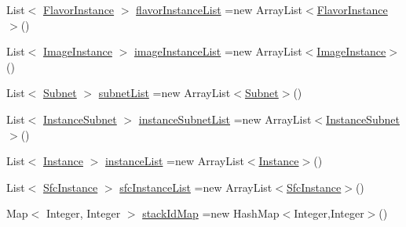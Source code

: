 \begin{DoxyCompactItemize}
\item 
List$<$ \mbox{\hyperlink{classcom_1_1example_1_1demo_1_1modular_1_1_flavor_instance}{Flavor\+Instance}} $>$ \mbox{\hyperlink{classcom_1_1example_1_1demo_1_1modular_1_1_mem_list_ad6c353bd434a49c087e1d329d6b4f0e2}{flavor\+Instance\+List}} =new Array\+List$<$\mbox{\hyperlink{classcom_1_1example_1_1demo_1_1modular_1_1_flavor_instance}{Flavor\+Instance}}$>$()
\item 
List$<$ \mbox{\hyperlink{classcom_1_1example_1_1demo_1_1modular_1_1_image_instance}{Image\+Instance}} $>$ \mbox{\hyperlink{classcom_1_1example_1_1demo_1_1modular_1_1_mem_list_a86c0e0c0404166fa542b91ecd549f7b6}{image\+Instance\+List}} =new Array\+List$<$\mbox{\hyperlink{classcom_1_1example_1_1demo_1_1modular_1_1_image_instance}{Image\+Instance}}$>$()
\item 
List$<$ \mbox{\hyperlink{classcom_1_1example_1_1demo_1_1modular_1_1_subnet}{Subnet}} $>$ \mbox{\hyperlink{classcom_1_1example_1_1demo_1_1modular_1_1_mem_list_aa969894668a457b320ce1e0566dcd377}{subnet\+List}} =new Array\+List$<$\mbox{\hyperlink{classcom_1_1example_1_1demo_1_1modular_1_1_subnet}{Subnet}}$>$()
\item 
List$<$ \mbox{\hyperlink{classcom_1_1example_1_1demo_1_1modular_1_1_instance_subnet}{Instance\+Subnet}} $>$ \mbox{\hyperlink{classcom_1_1example_1_1demo_1_1modular_1_1_mem_list_a3c347b341271733755f2f01424b29ae9}{instance\+Subnet\+List}} =new Array\+List$<$\mbox{\hyperlink{classcom_1_1example_1_1demo_1_1modular_1_1_instance_subnet}{Instance\+Subnet}}$>$()
\item 
List$<$ \mbox{\hyperlink{classcom_1_1example_1_1demo_1_1modular_1_1_instance}{Instance}} $>$ \mbox{\hyperlink{classcom_1_1example_1_1demo_1_1modular_1_1_mem_list_a3427df480ee5697d304f9e7eea795a63}{instance\+List}} =new Array\+List$<$\mbox{\hyperlink{classcom_1_1example_1_1demo_1_1modular_1_1_instance}{Instance}}$>$()
\item 
List$<$ \mbox{\hyperlink{classcom_1_1example_1_1demo_1_1modular_1_1_sfc_instance}{Sfc\+Instance}} $>$ \mbox{\hyperlink{classcom_1_1example_1_1demo_1_1modular_1_1_mem_list_a4ace55b784bc04ef0e0f891369c7f707}{sfc\+Instance\+List}} =new Array\+List$<$\mbox{\hyperlink{classcom_1_1example_1_1demo_1_1modular_1_1_sfc_instance}{Sfc\+Instance}}$>$()
\item 
Map$<$ Integer, Integer $>$ \mbox{\hyperlink{classcom_1_1example_1_1demo_1_1modular_1_1_mem_list_ae315e82cbc5ef939443da55c5ba4593c}{stack\+Id\+Map}} =new Hash\+Map$<$Integer,Integer$>$()
\end{DoxyCompactItemize}


